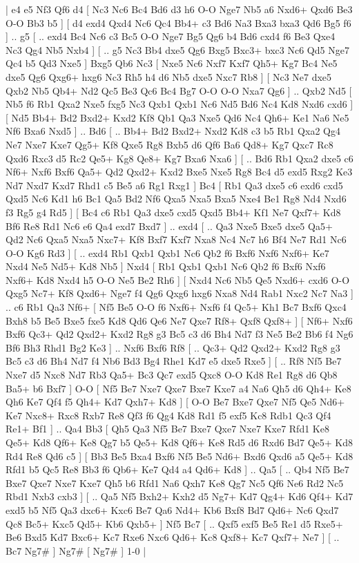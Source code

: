 \makegametitle 
|   e4   e5    Nf3   Qf6    d4 [  Nc3 Nc6  Bc4 Bd6  d3 h6  O-O Nge7  Nb5 a6  Nxd6+ Qxd6  Be3 O-O  Bb3 b5   ]  [  d4 exd4  Qxd4 Nc6  Qc4 Bb4+  c3 Bd6  Na3 Bxa3  bxa3 Qd6  Bg5 f6   ] .. g5 [ .. exd4  Bc4 Nc6  c3 Bc5  O-O Nge7  Bg5 Qg6  b4 Bd6  cxd4 f6  Be3 Qxe4  Nc3 Qg4  Nb5 Nxb4   ]  [ .. g5  Nc3 Bb4  dxe5 Qg6  Bxg5 Bxc3+  bxc3 Nc6  Qd5 Nge7  Qc4 b5  Qd3 Nxe5   ]  Bxg5   Qb6    Nc3 [  Nxe5 Nc6  Nxf7 Kxf7  Qh5+ Kg7  Bc4 Ne5  dxe5 Qg6  Qxg6+ hxg6  Nc3 Rh5  h4 d6  Nb5 dxe5  Nxc7 Rb8   ]  [  Nc3 Ne7  dxe5 Qxb2  Nb5 Qb4+  Nd2 Qc5  Be3 Qc6  Bc4 Bg7  O-O O-O  Nxa7 Qg6   ] .. Qxb2    Nd5 [  Nb5 f6  Rb1 Qxa2  Nxe5 fxg5  Nc3 Qxb1  Qxb1 Nc6  Nd5 Bd6  Nc4 Kd8  Nxd6 cxd6   ]  [  Nd5 Bb4+  Bd2 Bxd2+  Kxd2 Kf8  Qb1 Qa3  Nxe5 Qd6  Nc4 Qh6+  Ke1 Na6  Ne5 Nf6  Bxa6 Nxd5   ] .. Bd6 [ .. Bb4+  Bd2 Bxd2+  Nxd2 Kd8  c3 b5  Rb1 Qxa2  Qg4 Ne7  Nxe7 Kxe7  Qg5+ Kf8  Qxe5 Rg8  Bxb5 d6  Qf6 Ba6  Qd8+ Kg7  Qxc7 Rc8  Qxd6 Rxc3  d5 Rc2  Qe5+ Kg8  Qe8+ Kg7  Bxa6 Nxa6   ]  [ .. Bd6  Rb1 Qxa2  dxe5 c6  Nf6+ Nxf6  Bxf6 Qa5+  Qd2 Qxd2+  Kxd2 Bxe5  Nxe5 Rg8  Bc4 d5  exd5 Rxg2  Ke3 Nd7  Nxd7 Kxd7  Rhd1 c5  Be5 a6  Rg1 Rxg1   ]  Bc4 [  Rb1 Qa3  dxe5 c6  exd6 cxd5  Qxd5 Nc6  Kd1 h6  Bc1 Qa5  Bd2 Nf6  Qxa5 Nxa5  Bxa5 Nxe4  Be1 Rg8  Nd4 Nxd6  f3 Rg5  g4 Rd5   ]  [  Bc4 c6  Rb1 Qa3  dxe5 cxd5  Qxd5 Bb4+  Kf1 Ne7  Qxf7+ Kd8  Bf6 Re8  Rd1 Nc6  e6 Qa4  exd7 Bxd7   ] .. exd4 [ .. Qa3  Nxe5 Bxe5  dxe5 Qa5+  Qd2 Nc6  Qxa5 Nxa5  Nxc7+ Kf8  Bxf7 Kxf7  Nxa8 Nc4  Nc7 h6  Bf4 Ne7  Rd1 Nc6  O-O Kg6  Rd3   ]  [ .. exd4  Rb1 Qxb1  Qxb1 Nc6  Qb2 f6  Bxf6 Nxf6  Nxf6+ Ke7  Nxd4 Ne5  Nd5+ Kd8  Nb5   ]  Nxd4 [  Rb1 Qxb1  Qxb1 Nc6  Qb2 f6  Bxf6 Nxf6  Nxf6+ Kd8  Nxd4 h5  O-O Ne5  Be2 Rh6   ]  [  Nxd4 Nc6  Nb5 Qe5  Nxd6+ cxd6  O-O Qxg5  Nc7+ Kf8  Qxd6+ Nge7  f4 Qg6  Qxg6 hxg6  Nxa8 Nd4  Rab1 Nxc2  Nc7 Na3   ] .. c6    Rb1   Qa3    Nf6+ [  Nf5 Be5  O-O f6  Nxf6+ Nxf6  f4 Qc5+  Kh1 Bc7  Bxf6 Qxc4  Bxh8 b5  Be5 Bxe5  fxe5 Kd8  Qd6 Qe6  Ne7 Qxe7  Rf8+ Qxf8  Qxf8+   ]  [  Nf6+ Nxf6  Bxf6 Qc3+  Qd2 Qxd2+  Kxd2 Rg8  g3 Bc5  c3 d6  Bh4 Nd7  f3 Ne5  Be2 Bb6  f4 Ng6  Bf6 Bh3  Rhd1 Bg2  Ke3   ] .. Nxf6    Bxf6   Rf8 [ .. Qc3+  Qd2 Qxd2+  Kxd2 Rg8  g3 Bc5  c3 d6  Bh4 Nd7  f4 Nb6  Bd3 Bg4  Rhe1 Kd7  e5 dxe5  Rxe5   ]  [ .. Rf8  Nf5 Be7  Nxe7 d5  Nxc8 Nd7  Rb3 Qa5+  Bc3 Qc7  exd5 Qxc8  O-O Kd8  Re1 Rg8  d6 Qb8  Ba5+ b6  Bxf7   ]  O-O [  Nf5 Be7  Nxe7 Qxe7  Bxe7 Kxe7  a4 Na6  Qh5 d6  Qh4+ Ke8  Qh6 Ke7  Qf4 f5  Qh4+ Kd7  Qxh7+ Kd8   ]  [  O-O Be7  Bxe7 Qxe7  Nf5 Qe5  Nd6+ Ke7  Nxc8+ Rxc8  Rxb7 Re8  Qf3 f6  Qg4 Kd8  Rd1 f5  exf5 Kc8  Rdb1 Qc3  Qf4 Re1+  Bf1   ] .. Qa4    Bb3 [  Qh5 Qa3  Nf5 Be7  Bxe7 Qxe7  Nxe7 Kxe7  Rfd1 Ke8  Qe5+ Kd8  Qf6+ Ke8  Qg7 b5  Qe5+ Kd8  Qf6+ Ke8  Rd5 d6  Rxd6 Bd7  Qe5+ Kd8  Rd4 Re8  Qd6 c5   ]  [  Bb3 Be5  Bxa4 Bxf6  Nf5 Be5  Nd6+ Bxd6  Qxd6 a5  Qe5+ Kd8  Rfd1 b5  Qc5 Re8  Bb3 f6  Qb6+ Ke7  Qd4 a4  Qd6+ Kd8   ] .. Qa5 [ .. Qb4  Nf5 Be7  Bxe7 Qxe7  Nxe7 Kxe7  Qh5 b6  Rfd1 Na6  Qxh7 Ke8  Qg7 Nc5  Qf6 Ne6  Rd2 Nc5  Rbd1 Nxb3  cxb3   ]  [ .. Qa5  Nf5 Bxh2+  Kxh2 d5  Ng7+ Kd7  Qg4+ Kd6  Qf4+ Kd7  exd5 b5  Nf5 Qa3  dxc6+ Kxc6  Be7 Qa6  Nd4+ Kb6  Bxf8 Bd7  Qd6+ Nc6  Qxd7 Qc8  Bc5+ Kxc5  Qd5+ Kb6  Qxb5+   ]  Nf5   Bc7 [ .. Qxf5  exf5 Be5  Re1 d5  Rxe5+ Be6  Bxd5 Kd7  Bxc6+ Kc7  Rxe6 Nxc6  Qd6+ Kc8  Qxf8+ Kc7  Qxf7+ Ne7   ]  [ .. Bc7  Ng7#   ]  Ng7#    [  Ng7#   ] 1-0  |
